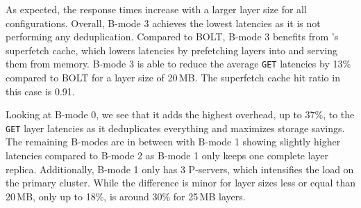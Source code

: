 
As expected, the response times increase with a larger layer size for all configurations.
%
Overall, B-mode 3 achieves the lowest latencies as it is not performing any deduplication.
%
Compared to BOLT, B-mode 3 benefits from \sysname{}'s superfetch cache, which
lowers latencies by prefetching layers into and serving them from memory.
%
B-mode 3 is able to reduce the average \texttt{GET} latencies by 13\% compared to
BOLT for a layer size of 20\,MB.
%
%
The superfetch cache hit ratio in this case is 0.91.
%

Looking at B-mode 0, we see that it adds the highest overhead, up to 37\%, to
the \texttt{GET} layer latencies as it deduplicates everything and maximizes
storage savings.
%
%
%
The remaining B-modes are in between with B-mode 1 showing slightly higher
latencies compared to B-mode 2 as B-mode 1 only keeps one complete layer
replica.
%
Additionally, B-mode 1 only has 3 P-servers, which intensifies the load on
the primary cluster.
%
%
While the difference is minor for layer sizes less or equal than 20\,MB, only
up to 18\%, is around 30\% for 25\,MB layers.

